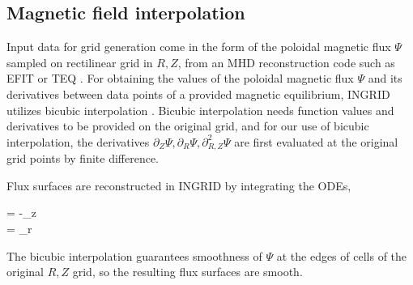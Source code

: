 \subsection{\label{sec:level2}Magnetic field interpolation}

Input data for grid generation come in the form of the poloidal
magnetic flux $\Psi$ sampled on rectilinear grid in $R,Z$, from an MHD
reconstruction code such as EFIT \cite{Lao_1985} or TEQ \cite{}. For
obtaining the values of the poloidal magnetic flux $\Psi$ and its
derivatives between data points of a provided magnetic equilibrium,
INGRID utilizes bicubic interpolation \cite{Press_1992}. Bicubic
interpolation needs function values and derivatives to be provided on
the original grid, and for our use of bicubic interpolation, the
derivatives $\partial_Z \Psi, \partial_R \Psi, \partial^2_{R,Z} \Psi$
are first evaluated at the original grid points by finite difference.


Flux surfaces are reconstructed in INGRID by integrating the ODEs,

\beqar
%
 = -\psi_{z} \\
 = \psi_{r}
%
\eeqar

The bicubic interpolation guarantees smoothness of $\Psi$ at the edges
of cells of the original $R,Z$ grid, so the resulting flux surfaces
are smooth.







